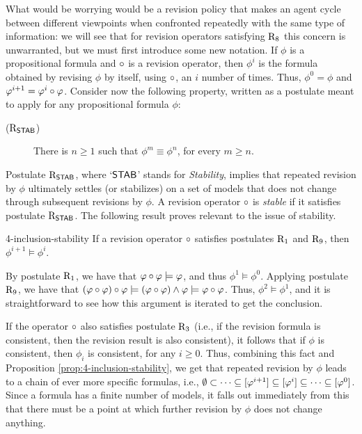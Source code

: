 What would be worrying would be a revision policy
that makes an agent cycle between different viewpoints
when confronted repeatedly with the same type of information:
we will see that for revision operators satisfying $\mathrm{R}_{8}$
this concern is unwarranted, but we must first introduce some new notation.
If $\phi$ is a propositional formula and $\circ$ is a revision operator,
then $\phi^i$ is the formula obtained 
by revising $\phi$ by itself, using $\circ$, an $i$ number of times.
Thus, $\phi^0=\phi$ and $\varphi^{i+1}={\varphi^i}\circ{\varphi}$.
Consider now the following property,
written as a postulate
meant to apply for any propositional formula $\phi$:

\begin{description}
	\item[($\mathrm{R}_{\mathsf{STAB}}$)] There is $n\geq 1$ such that $\phi^m\equiv\phi^n$,	for every $m\geq n$.
\end{description}

Postulate $\mathrm{R}_{\mathsf{STAB}}$, where `$\mathsf{STAB}$' stands for \emph{Stability},
implies that repeated revision by $\phi$ ultimately 
settles (or stabilizes) on a set of models
that does not change through subsequent revisions by $\phi$.
A revision operator $\circ$ is \emph{stable} 
if it satisfies postulate $\mathrm{R}_{\mathsf{STAB}}$. 
The following result proves relevant to the issue of stability.

\begin{prp}{}{4-inclusion-stability}
	If a revision operator $\circ$ satisfies postulates $\mathrm{R}_{1}$ and $\mathrm{R}_{9}$,
	then $\phi^{i+1}\models\phi^i$.
\end{prp}
\begin{prf*}{}{}%
	By postulate $\mathrm{R}_{1}$, we have that $\varphi\circ\varphi\models\varphi$,
	and thus $\phi^1\models\phi^0$.
	Applying postulate $\mathrm{R}_{9}$,
	we have that $(\varphi\circ\varphi)\circ\varphi\models(\varphi\circ\varphi)\land\varphi\models\varphi\circ\varphi$.
	Thus, $\phi^2\models\phi^1$, and it is straightforward to see how this argument
	is iterated to get the conclusion.
\end{prf*}

If the operator $\circ$ also satisfies postulate $\mathrm{R}_{3}$ 
(i.e., if the revision formula
is consistent, then the revision result is also consistent),
it follows that if $\phi$ is consistent, 
then $\phi_i$ is consistent, for any $i\geq 0$.
Thus, combining this fact and Proposition \ref{prop:4-inclusion-stability},
we get that 
repeated revision by $\phi$ leads to a chain of ever more specific formulas,
i.e.,
$\emptyset\subset\dots\subseteq[\varphi^{i+1}]\subseteq[\varphi^i]\subseteq\dots\subseteq[\varphi^0]$.
Since a formula has a finite number of models, it falls out immediately
from this that there must be a point at which further revision by $\phi$
does not change anything.

